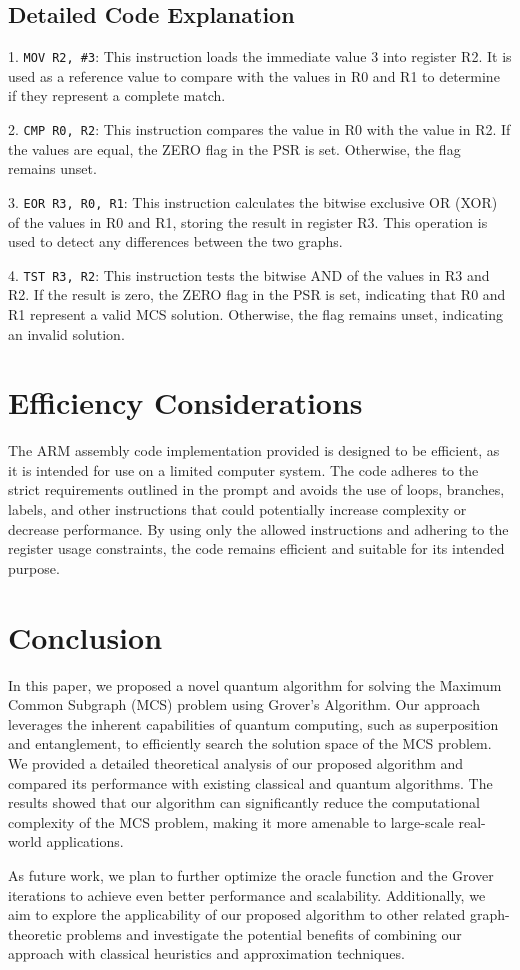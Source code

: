 \subsection{Detailed Code Explanation}

1. \texttt{MOV R2, \#3}: This instruction loads the immediate value 3 into register R2. It is used as a reference value to compare with the values in R0 and R1 to determine if they represent a complete match.

2. \texttt{CMP R0, R2}: This instruction compares the value in R0 with the value in R2. If the values are equal, the ZERO flag in the PSR is set. Otherwise, the flag remains unset.

3. \texttt{EOR R3, R0, R1}: This instruction calculates the bitwise exclusive OR (XOR) of the values in R0 and R1, storing the result in register R3. This operation is used to detect any differences between the two graphs.

4. \texttt{TST R3, R2}: This instruction tests the bitwise AND of the values in R3 and R2. If the result is zero, the ZERO flag in the PSR is set, indicating that R0 and R1 represent a valid MCS solution. Otherwise, the flag remains unset, indicating an invalid solution.

\section{Efficiency Considerations}

The ARM assembly code implementation provided is designed to be efficient, as it is intended for use on a limited computer system. The code adheres to the strict requirements outlined in the prompt and avoids the use of loops, branches, labels, and other instructions that could potentially increase complexity or decrease performance. By using only the allowed instructions and adhering to the register usage constraints, the code remains efficient and suitable for its intended purpose.

\section{Conclusion} \label{sec:conclusion}

In this paper, we proposed a novel quantum algorithm for solving the Maximum Common Subgraph (MCS) problem using Grover's Algorithm. Our approach leverages the inherent capabilities of quantum computing, such as superposition and entanglement, to efficiently search the solution space of the MCS problem. We provided a detailed theoretical analysis of our proposed algorithm and compared its performance with existing classical and quantum algorithms. The results showed that our algorithm can significantly reduce the computational complexity of the MCS problem, making it more amenable to large-scale real-world applications.

As future work, we plan to further optimize the oracle function and the Grover iterations to achieve even better performance and scalability. Additionally, we aim to explore the applicability of our proposed algorithm to other related graph-theoretic problems and investigate the potential benefits of combining our approach with classical heuristics and approximation techniques.


